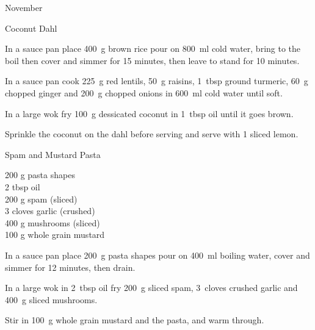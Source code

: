 \begin{menu}{November}
\begin{recipe}{2}{Coconut Dahl}
    \begin{instructions}
    \item 
    In a
    sauce pan
    place
    400~g  brown rice
    pour on
    800~ml  cold water,
    bring to the boil then cover and simmer for 15 minutes,
    then leave to stand for 10 minutes.
  \item 
        In a sauce pan cook
        225~g  red lentils,
        50~g  raisins,
        1~tbsp  ground turmeric,
        60~g chopped ginger
        and
        200~g chopped onions
        in
        600~ml  cold water
        until soft.
      \item 
        In a large wok fry
        100~g  dessicated coconut
        in
        1~tbsp  oil
        until it goes brown.
      \item 
        Sprinkle the coconut on the dahl
        before serving
        and
        serve with
        1 sliced lemon.
      
    \end{instructions}
    \end{recipe}%
  
    \begin{recipe}{1}{Spam and Mustard Pasta}%
		\begin{ingredients}
		200 g pasta shapes  \\
	2 tbsp oil  \\
	200 g spam (sliced) \\
	3 cloves garlic (crushed) \\
	400 g mushrooms (sliced) \\
	100 g whole grain mustard  \\
	
		\end{ingredients}
	
	
    \begin{instructions}
    \item 
    In a
    sauce pan
    place
    200~g  pasta shapes
    pour on
    400~ml  boiling water,
    cover and simmer for 12 minutes, then drain.
  \item 
        In a large wok in
        2~tbsp  oil
        fry
        200~g sliced spam,
        3~cloves crushed garlic
        and
        400~g sliced mushrooms.
      \item 
        Stir in
        100~g  whole grain mustard
        and the pasta,
        and warm through.
      
    \end{instructions}
    \end{recipe}%
  
    \clearpage
    \end{menu}
	
